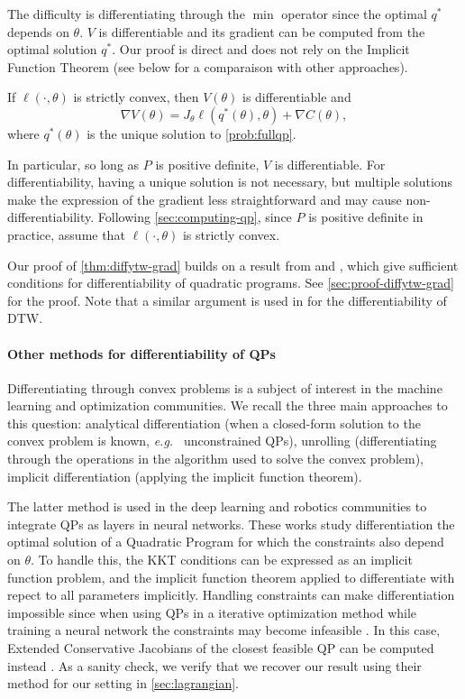 The difficulty is differentiating through the $\min$ operator since the optimal $q^*$ depends on $\theta$. $V$ is differentiable and its gradient can be computed from the optimal solution $q^*$. Our proof is direct and does not rely on the Implicit Function Theorem (see below for a comparaison with other approaches).

\begin{theorem}\label{thm:diffytw-grad}
    If $\ell(\cdot, \theta)$ is strictly convex, then $V(\theta)$ is differentiable and
    \begin{equation}
        \nabla V(\theta) = J_\theta \ell(q^*(\theta), \theta) + \nabla C(\theta),
    \end{equation} where $q^*(\theta)$ is the unique solution to \cref{prob:fullqp}.
\end{theorem}

In particular, so long as $P$ is positive definite, $V$ is differentiable. For differentiability, having a unique solution is not necessary, but multiple solutions make the expression of the gradient less straightforward and may cause non-differentiability. Following \cref{sec:computing-qp}, since $P$ is positive definite in practice, assume that $\ell(\cdot, \theta)$ is strictly convex.

Our proof of \cref{thm:diffytw-grad} builds on a result from \cite{shapiro} and \cite{lee}, which give sufficient conditions for differentiability of quadratic programs. See \cref{sec:proof-diffytw-grad} for the proof. Note that a similar argument is used in \cite{tavenard-dtw-diff} for the differentiability of DTW.

\paragraph{Other methods for differentiability of QPs}
Differentiating through convex problems is a subject of interest in the machine learning and optimization communities. We recall the three main approaches to this question: analytical differentiation (when a closed-form solution to the convex problem is known, \emph{e.g.\ } unconstrained QPs), unrolling (differentiating through the operations in the algorithm used to solve the convex problem), implicit differentiation (applying the implicit function theorem).

The latter method is used in the deep learning and robotics communities to integrate QPs as layers in neural networks\citep{QP-layers,optnet}. These works study differentiation the optimal solution of a Quadratic Program for which the constraints also depend on $\theta$. To handle this, the KKT conditions can be expressed as an implicit function problem, and the implicit function theorem applied to differentiate with repect to all parameters implicitly. Handling constraints can make differentiation impossible since when using QPs in a iterative optimization method while training a neural network the constraints may become infeasible \citep{QP-Layers}. In this case, Extended Conservative Jacobians of the closest feasible QP can be computed instead \citep{QP-layers}. As a sanity check, we verify that we recover our result using their method for our setting in \cref{sec:lagrangian}.

